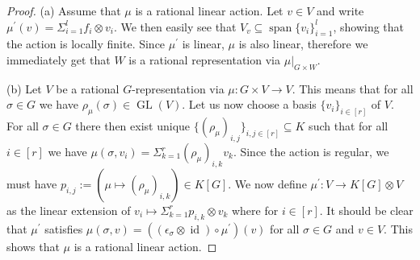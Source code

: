 \message{ !name(roughdraft.tex)}\documentclass[a4paper]{article}
\theoremstyle{prrt}
\newtheorem{definition}[theorem]{Definition}
\begin{document}
\begin{proof}
  (a) \; Assume that $\mu$ is a rational linear action.
  Let $v \in V$ and write $\mu^\prime (v) = \Sigma_{i=1}^l f_i \otimes v_i$. %
  We then easily see that $V_v \subseteq \operatorname{span}\{v_i\}_{i=1}^l$, showing that the action is locally finite.
  Since $\mu^\prime$ is linear, $\mu$ is also linear, therefore we immediately get that $W$ is a rational representation via $\left. \mu \right|_{G\times W}$.

  (b) \; Let $V$ be a rational $G$-representation via $\mu \colon G \times V \rightarrow V$.
  This means that for all $\sigma \in G$ we have $\rho_\mu (\sigma) \in \operatorname{GL}(V)$.
  Let us now choose a basis $\{v_i\}_{i \in [r]}$ of $V$.
  For all $\sigma \in G$ there then exist unique $\{ \left( \rho_\mu \right)_{i,j}\}_{i,j \in [r]} \subseteq K$ such that for all $i \in [r]$ we have $\mu (\sigma,v_i) = \Sigma_{k=1}^r \left(\rho_\mu\right)_{i,k} v_k$.
  Since the action is regular, we must have $p_{i,j} := ( \mu \mapsto (\rho_\mu)_{i,k}) \in K[G]$.
  We now define $\mu^\prime \colon V \rightarrow K[G] \otimes V$ as the linear extension of $v_i \mapsto \Sigma_{k=1}^r p_{i,k} \otimes v_k$ where for $i \in [r]$.
  It should be clear that $\mu^\prime$ satisfies $ \mu \left( \sigma , v \right) = \left( \left( \epsilon_\sigma \otimes \operatorname{id} \right) \circ \mu^\prime \right) \left(v\right) $ for all $\sigma \in G$ and $v \in V$.
  This shows that $\mu$ is a rational linear action.
  \end{proof}
\end{document}
